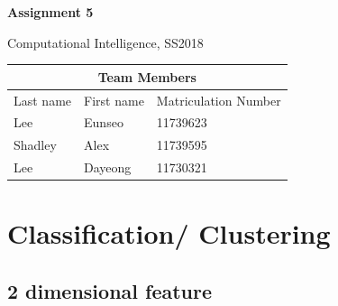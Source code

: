 \documentclass[a4paper]{article}
\begin{document}
	\begin{titlepage}
		\centering
		{\huge \bf Assignment 5\par}
		\vspace{1cm}
		{\Large Computational Intelligence, SS2018\par}
		\vspace{1cm}
		\begin{tabular}{|l|l|l|}
			\hline
			\multicolumn{3}{|c|}{\textbf{Team Members}}   \\ \hline
			Last name & First name & Matriculation Number \\ \hline
			Lee       & Eunseo     & 11739623             \\ \hline
			Shadley   & Alex       & 11739595             \\ \hline
			Lee       & Dayeong    & 11730321             \\ \hline
		\end{tabular}
	\end{titlepage}
	
	\section{Classiﬁcation/ Clustering}
	\subsection{2 dimensional feature}
\end{document}
